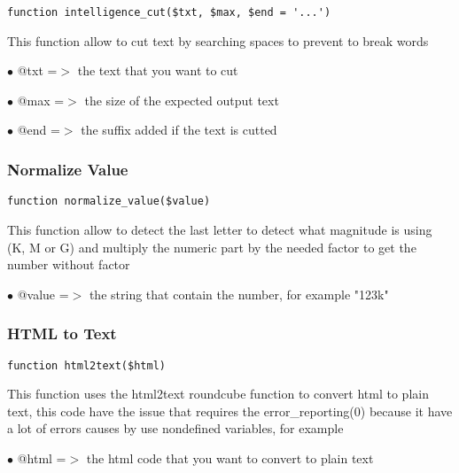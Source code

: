 \documentclass[a4paper]{article}
\begin{document}
\begin{lstlisting}
function intelligence_cut($txt, $max, $end = '...')
\end{lstlisting}

This function allow to cut text by searching spaces to prevent to break words

\begin{compactitem}
\item[\color{myblue}$\bullet$] @txt =$>$ the text that you want to cut
\item[\color{myblue}$\bullet$] @max =$>$ the size of the expected output text
\item[\color{myblue}$\bullet$] @end =$>$ the suffix added if the text is cutted
\end{compactitem}

\hypertarget{toc243}{}
\subsubsection{Normalize Value}

\begin{lstlisting}
function normalize_value($value)
\end{lstlisting}

This function allow to detect the last letter to detect what magnitude is
using (K, M or G) and multiply the numeric part by the needed factor to
get the number without factor

\begin{compactitem}
\item[\color{myblue}$\bullet$] @value =$>$ the string that contain the number, for example "123k"
\end{compactitem}

\hypertarget{toc244}{}
\subsubsection{HTML to Text}

\begin{lstlisting}
function html2text($html)
\end{lstlisting}

This function uses the html2text roundcube function to convert html to
plain text, this code have the issue that requires the error\_reporting(0)
because it have a lot of errors causes by use nondefined variables, for
example

\begin{compactitem}
\item[\color{myblue}$\bullet$] @html =$>$ the html code that you want to convert to plain text
\end{compactitem}
\end{document}
